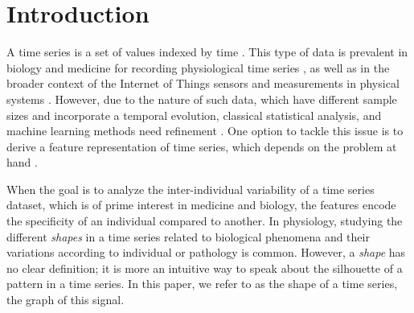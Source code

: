 

\section{Introduction}


A time series is a set of values indexed by time \cite{trirat2024universal}.
This type of data is prevalent in biology and medicine for recording physiological time series \cite{wang2016research,bar2012studying,germain2023unsupervised}, as well as in the broader context of the Internet of Things sensors \cite{fathy2018large} and measurements in physical systems \cite{luo2021deep}.
 However, due to the nature of such data, which have different sample sizes and incorporate a temporal evolution, classical statistical analysis, and machine learning methods need refinement \cite{anderson2011statistical}.
 One option to tackle this issue is to derive a feature representation of time series, which depends on the problem at hand \cite{trirat2024universal}.

 When the goal is to analyze the inter-individual variability of a time series dataset, which is of prime interest in medicine and biology,
  the features encode the specificity of an individual compared to another. 
  In physiology, studying the different \textit{shapes} in a time series related to biological phenomena and their variations according to individual or pathology is common.
  However, a \textit{shape} has no clear definition; it is more an intuitive way to speak about the silhouette of a pattern in a time series. In this paper, we refer to as the shape of a time series, the graph of this signal.

